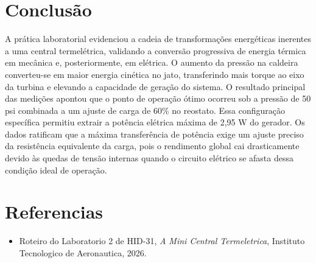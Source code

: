 \documentclass[12pt,a4paper]{article}
\begin{document}
\section{Conclusão}

A prática laboratorial evidenciou a cadeia de transformações energéticas inerentes a uma central termelétrica, validando a conversão progressiva de energia térmica em mecânica e, posteriormente, em elétrica. O aumento da pressão na caldeira converteu-se em maior energia cinética no jato, transferindo mais torque ao eixo da turbina e elevando a capacidade de geração do sistema. O resultado principal das medições apontou que o ponto de operação ótimo ocorreu sob a pressão de 50 psi combinada a um ajuste de carga de 60\% no reostato. Essa configuração específica permitiu extrair a potência elétrica máxima de 2,95 W do gerador. Os dados ratificam que a máxima transferência de potência exige um ajuste preciso da resistência equivalente da carga, pois o rendimento global cai drasticamente devido às quedas de tensão internas quando o circuito elétrico se afasta dessa condição ideal de operação.

\section*{Referencias}

\begin{itemize}
  \item Roteiro do Laboratorio 2 de HID-31, \textit{A Mini Central Termeletrica}, Instituto Tecnologico de Aeronautica, 2026.
\end{itemize}
\end{document}
